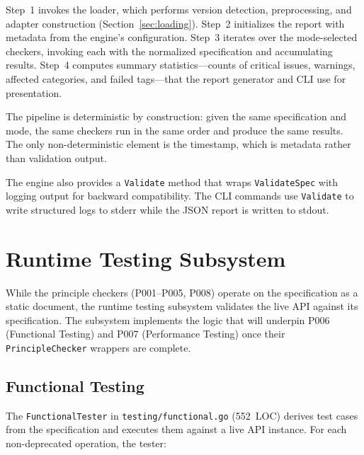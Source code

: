 Step~1 invokes the loader, which performs version detection, preprocessing, and adapter construction (Section~\ref{sec:loading}). Step~2 initializes the report with metadata from the engine's configuration. Step~3 iterates over the mode-selected checkers, invoking each with the normalized specification and accumulating results. Step~4 computes summary statistics---counts of critical issues, warnings, affected categories, and failed tags---that the report generator and CLI use for presentation.

The pipeline is deterministic by construction: given the same specification and mode, the same checkers run in the same order and produce the same results. The only non-deterministic element is the timestamp, which is metadata rather than validation output.

The engine also provides a \texttt{Validate} method that wraps \texttt{ValidateSpec} with logging output for backward compatibility. The CLI commands use \texttt{Validate} to write structured logs to stderr while the JSON report is written to stdout.

\section{Runtime Testing Subsystem}
\label{sec:runtime-testing}

While the principle checkers (P001--P005, P008) operate on the specification as a static document, the runtime testing subsystem validates the live API against its specification. The subsystem implements the logic that will underpin P006 (Functional Testing) and P007 (Performance Testing) once their \texttt{PrincipleChecker} wrappers are complete.

\subsection{Functional Testing}
\label{subsec:functional-testing}

The \texttt{FunctionalTester} in \texttt{testing/functional.go} (552~LOC) derives test cases from the specification and executes them against a live API instance. For each non-deprecated operation, the tester:

